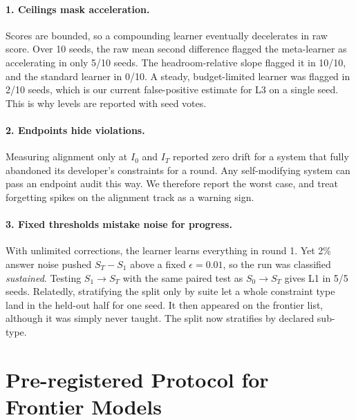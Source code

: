 \documentclass[11pt]{article}
\begin{document}
\paragraph{1. Ceilings mask acceleration.} Scores are bounded, so a compounding learner eventually decelerates in raw score. Over 10 seeds, the raw mean second difference flagged the meta-learner as accelerating in only 5/10 seeds. The headroom-relative slope flagged it in 10/10, and the standard learner in 0/10. A steady, budget-limited learner was flagged in 2/10 seeds, which is our current false-positive estimate for L3 on a single seed. This is why levels are reported with seed votes.

\paragraph{2. Endpoints hide violations.} Measuring alignment only at $I_0$ and $I_T$ reported zero drift for a system that fully abandoned its developer's constraints for a round. Any self-modifying system can pass an endpoint audit this way. We therefore report the worst case, and treat forgetting spikes on the alignment track as a warning sign.

\paragraph{3. Fixed thresholds mistake noise for progress.} With unlimited corrections, the learner learns everything in round 1. Yet 2\% answer noise pushed $S_T - S_1$ above a fixed $\epsilon = 0.01$, so the run was classified \emph{sustained}. Testing $S_1 \to S_T$ with the same paired test as $S_0 \to S_T$ gives L1 in 5/5 seeds. Relatedly, stratifying the split only by suite let a whole constraint type land in the held-out half for one seed. It then appeared on the frontier list, although it was simply never taught. The split now stratifies by declared sub-type.

\section{Pre-registered Protocol for Frontier Models}
\label{sec:protocol}
\end{document}
